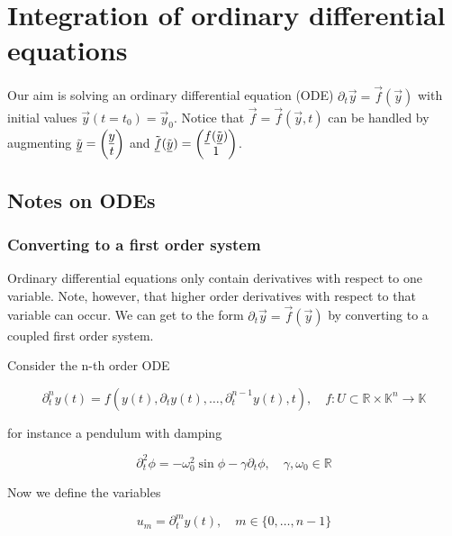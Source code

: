 \section{Integration of ordinary differential equations}
\thispagestyle{plain}

Our aim is solving an ordinary differential equation (ODE) 
$\partial_t \vec{y} = \vec{f} \left(\vec{y} \right)$ with initial 
values $\vec{y}(t = t_0)=\vec{y}_0$. Notice that $\vec{f} = \vec{f}(\vec{y}, t)$ 
can be handled by augmenting $\Tilde{\vec{y}} = \begin{pmatrix} \vec{y} \\ t \end{pmatrix}$ 
and $\Tilde{\vec{f}}(\Tilde{\vec{y}}) = \begin{pmatrix} \vec{f}(\Tilde{\vec{y}}) \\ 1 \end{pmatrix}$.

\subsection{Notes on ODEs}
\subsubsection{Converting to a first order system}
Ordinary differential equations only contain derivatives with respect
to one variable. Note, however, that higher order derivatives with respect
to that variable can occur. We can get to the form $\partial_t \vec{y} = \vec{f} \left(\vec{y} \right)$
by converting to a coupled first order system.

Consider the n-th order ODE

\begin{equation}
    \partial_t^n y(t) = f\left(y(t), \partial_t y(t), \dots, \partial_t^{n-1} y(t), t\right), \quad f: U \subset \mathbb{R} \times \mathbb{K}^n \to \mathbb{K}
\end{equation}

for instance a pendulum with damping

\begin{equation}
    \partial_t^2 \phi = - \omega_0^2 \sin \phi - \gamma \partial_t \phi , \quad \gamma, \omega_0 \in \mathbb{R}
\end{equation}

Now we define the variables

\begin{equation}
    u_m = \partial_t^m y(t), \quad m \in \{0, \dots, n-1\}
\end{equation}

